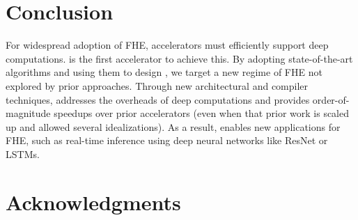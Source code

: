 \section{Conclusion}\label{sec:conclusion}

For widespread adoption of FHE, accelerators must efficiently support deep computations.
\name is the first accelerator to achieve this.
By adopting state-of-the-art algorithms and using them to design \name,
we target a new regime of FHE not explored by prior approaches.
Through new architectural and compiler techniques, \name addresses the overheads
of deep computations and provides order-of-magnitude speedups over prior accelerators
(even when that prior work is scaled up and allowed several idealizations).
As a result, \name enables new applications for FHE, such as real-time inference
using deep neural networks like ResNet or LSTMs.



\section*{Acknowledgments}

